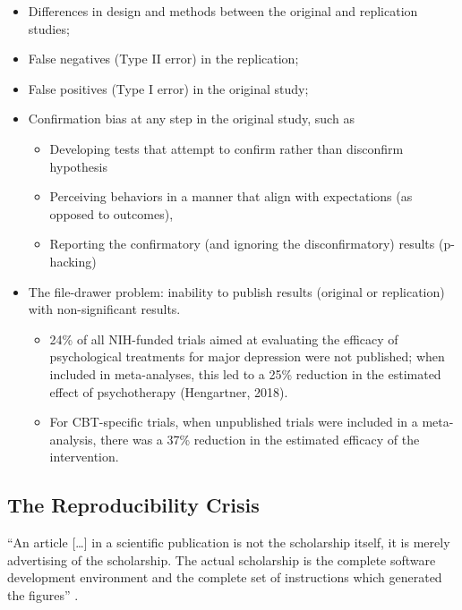 \documentclass[
  english,
]{book}
\providecommand{\tightlist}{%
  \setlength{\itemsep}{0pt}\setlength{\parskip}{0pt}}
\begin{document}
\begin{itemize}
\tightlist
\item
  Differences in design and methods between the original and replication studies;
\item
  False negatives (Type II error) in the replication;
\item
  False positives (Type I error) in the original study;
\item
  Confirmation bias at any step in the original study, such as

  \begin{itemize}
  \tightlist
  \item
    Developing tests that attempt to confirm rather than disconfirm hypothesis
  \item
    Perceiving behaviors in a manner that align with expectations (as opposed to outcomes),
  \item
    Reporting the confirmatory (and ignoring the disconfirmatory) results (p-hacking)
  \end{itemize}
\item
  The file-drawer problem: inability to publish results (original or replication) with non-significant results.

  \begin{itemize}
  \tightlist
  \item
    24\% of all NIH-funded trials aimed at evaluating the efficacy of psychological treatments for major depression were not published; when included in meta-analyses, this led to a 25\% reduction in the estimated effect of psychotherapy (Hengartner, 2018).
  \item
    For CBT-specific trials, when unpublished trials were included in a meta-analysis, there was a 37\% reduction in the estimated efficacy of the intervention.
  \end{itemize}
\end{itemize}

\hypertarget{the-reproducibility-crisis}{%
\subsection{The Reproducibility Crisis}\label{the-reproducibility-crisis}}

``An article {[}\ldots{]} in a scientific publication is not the scholarship itself, it is merely advertising of the scholarship. The actual scholarship is the complete software development environment and the complete set of instructions which generated the figures'' \citep{buckheit_wavelab_1995}.
\end{document}
